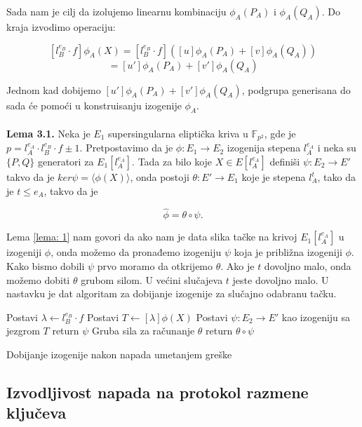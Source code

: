 \documentclass[a4paper]{article}
\begin{document}
\noindent Sada nam je cilj da izolujemo linearnu kombinaciju $ \phi_A(P_A)$ i  $ \phi_A(Q_A)$. Do kraja izvodimo operaciju:

$$[l^{e_B}_{B} \cdot f]\phi_A(X) = [l^{e_B}_{B} \cdot f] ([u]\phi_A(P_A) + [v]\phi_A(Q_A))$$
$$= [u']\phi_A(P_A) + [v']\phi_A(Q_A)$$

Jednom kad dobijemo $ [u']\phi_A(P_A) + [v']\phi_A(Q_A)$, podgrupa generisana do sada će pomoći u konstruisanju izogenije $\phi_A$.
\\
\\
\textbf{Lema 3.1.} \label{lema: 1} Neka je $E_1$ supersingularna eliptička kriva u $\mathbb{F}_{p^2}$, gde je $p = l^{e_A}_{A} \cdot l^{e_B}_{B} \cdot f \pm 1$. Pretpostavimo da je $\phi : E_1 \longrightarrow E_2$ izogenija stepena $l_A^{e_A}$ i neka su $\{P, Q\}$ generatori za $E_1[l_A^{e_A}]$. Tada za bilo koje $X \in E[l_A^{e_A}]$ definiši $\psi : E_2 \longrightarrow E'$ takvo da je $ker \psi = \langle \phi(X) \rangle$, onda postoji $\theta: E' \longrightarrow E_1$ koje je stepena $l_A^t$, tako da je $t \leq e_A$, takvo da je 

$$\widehat{\phi} = \theta \circ \psi.$$

Lema \ref{lema: 1} nam govori da ako nam je data slika tačke na krivoj $E_1[l^{e_A}_A]$ u izogeniji $\phi$, onda možemo da pronađemo izogeniju $\psi$ koja je približna izogeniji $\phi$. Kako bismo dobili $\psi$ prvo moramo da otkrijemo $\theta$. Ako je $t$ dovoljno malo, onda možemo dobiti $\theta$ grubom silom. U većini slučajeva $t$ jeste dovoljno malo. U nastavku je dat algoritam za dobijanje izogenije za slučajno odabranu tačku.


\begin{algorithm}
	\label{alg: napad greskom}
	
	\Output{$\widehat{\phi}$}

	Postavi $\lambda \longleftarrow l_B^{e_B} \cdot f$ \;
	Postavi $T \longleftarrow [\lambda]\phi(X)$ \;
	Postavi $\psi: E_2 \longrightarrow E'$ kao izogeniju sa jezgrom $T$\;
		{
			return $\psi$
		}
		{
			Gruba sila za računanje $\theta$
		}
	return $\theta \circ \psi$
	\caption{Dobijanje izogenije nakon napada umetanjem greške}
\end{algorithm}


\subsection{Izvodljivost napada na protokol razmene ključeva}
\end{document}
